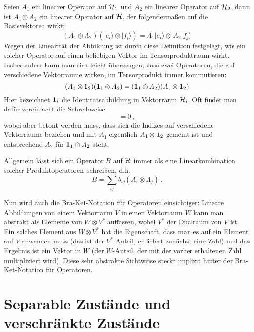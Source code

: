 Seien $A_1$ ein linearer Operator auf ${\cal H}_1$ und $A_2$ ein
linearer Operator auf ${\cal H}_2$, dann ist $A_1\otimes A_2$ ein 
linearer Operator auf ${\cal H}$, der folgenderma\ss en auf die Basisvektoren
wirkt:
\begin{equation}
    (A_1 \otimes A_2) ( |e_i\rangle \otimes | f_j\rangle)  = 
                A_1|e_i\rangle \otimes \,  A_2|f_j\rangle 
\end{equation}
Wegen der Linearit\"at der Abbildung ist durch 
diese Definition festgelegt, wie ein solcher Operator auf einen
beliebigen Vektor im Tensorproduktraum wirkt. Insbesondere kann man
sich leicht \"uberzeugen, dass zwei Operatoren, die auf verschiedene
Vektorr\"aume wirken, im Tensorprodukt immer kommutieren:
\begin{equation}
     (A_1 \otimes {\bf 1}_2 ) ({\bf 1}_1 \otimes A_2) =
    ({\bf 1}_1 \otimes A_2)  (A_1 \otimes {\bf 1}_2 ) 
\end{equation}
Hier bezeichnet ${\bf 1}_i$ die Identit\"atsabbildung in Vektorraum ${\cal H}_i$.
Oft findet man daf\"ur vereinfacht die Schreibweise
\begin{equation}
       [A_1,A_2] = 0   \, ,
\end{equation}
wobei aber betont werden muss, dass sich die Indizes auf verschiedene
Vektorr\"aume beziehen und mit $A_1$ eigentlich $A_1\otimes {\bf 1}_2$ 
gemeint ist und entsprechend $A_2$ f\"ur ${\bf 1}_1\otimes A_2$ steht. 

Allgemein l\"asst sich ein Operator $B$ auf ${\cal H}$ immer als eine
Linearkombination solcher \glqq Produktoperatoren\grqq\ schreiben,
d.h.
\begin{equation}
       B = \sum_{ij} b_{ij} (A_i \otimes A_j)  \, .
\end{equation}

Nun wird auch die Bra-Ket-Notation f\"ur Operatoren einsichtiger:
Lineare Abbildungen von einem Vektorraum
$V$ in einen Vektorraum $W$ kann man abstrakt
als Elemente von $W\otimes V^*$ auffassen,
wobei $V^*$ der Dualraum von $V$ ist. Ein solches
Element aus $W\otimes V^*$ hat die
Eigenschaft, dass man es auf ein Element auf $V$
anwenden muss (das ist der $V^*$-Anteil, er liefert
zun\"achst eine Zahl) und das
Ergebnis ist ein Vektor in $W$ (der $W$-Anteil, der
mit der vorher erhaltenen Zahl multipliziert wird). 
Diese sehr abstrakte Sichtweise steckt implizit hinter
der Bra-Ket-Notation f\"ur Operatoren.

\section{Separable Zust\"ande und verschr\"ankte Zust\"ande}

